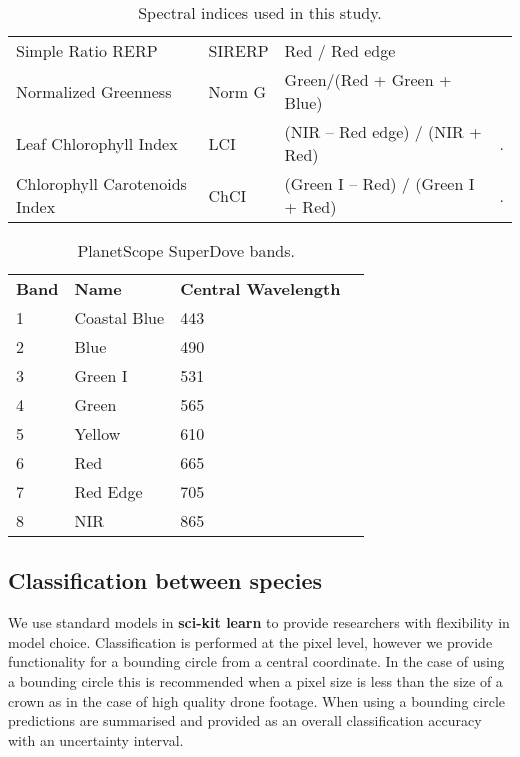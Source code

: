 \documentclass[9pt,lineno]{elife}
\begin{document}
\begin{table}[]
\begin{fullwidth}
\begin{center}
\begin{tabular}{p{3cm}p{2cm}p{4cm}p{1cm}}
Simple Ratio RERP                                         & SIRERP       & Red / Red edge                                                   &                \\
Normalized Greenness                                      & Norm G       & Green/(Red + Green + Blue)                                       &                \\
Leaf Chlorophyll Index                                    & LCI          & (NIR – Red edge) / (NIR  + Red)                                  & .              \\
Chlorophyll Carotenoids Index                             & ChCI         & (Green I – Red) / (Green I + Red)                                & .
\end{tabular}
\caption{
        Spectral indices used in this study.
}
\label{tab:tabindices}
\end{center}
\end{fullwidth}
\end{table}

\begin{table}[]
\begin{center}

\begin{tabular}{llll}
\textbf{Band} & \textbf{Name}         &\textbf{ Central Wavelength} \\
1    & Coastal Blue & 443                 &                  \\
2    & Blue         & 490                 &                  \\
3    & Green   I    & 531                 &                  \\
4    & Green        & 565                 &                  \\
5    & Yellow       & 610                 &                  \\
6    & Red          & 665                 &                  \\
7    & Red Edge     & 705                 &                  \\
8    & NIR          & 865                 &
\end{tabular}
\caption{
        PlanetScope SuperDove bands.
}
\label{tab:tabML}
\end{center}
\end{table}

\subsection{Classification between species}
We use standard models in \textbf{sci-kit learn} to provide researchers with flexibility in model choice. Classification is performed at the pixel level, however we provide functionality for a bounding circle from a central coordinate. In the case of using a bounding circle this is recommended when a pixel size is less than the size of a crown as in the case of high quality drone footage. When using a bounding circle predictions are summarised and provided as an overall classification accuracy with an uncertainty interval.
\end{document}
